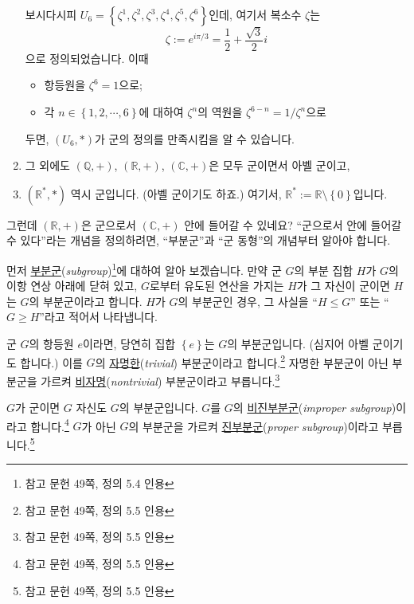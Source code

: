 \documentclass[12pt]{paper}
\begin{document}
\begin{enumerate}
    보시다시피 $U_6 = \left\{ \zeta^1 , \zeta^2 , \zeta^3 , \zeta^4 , \zeta^5 , \zeta^6 \right\}$인데,
    여기서 복소수 $\zeta$는 $$\zeta := e^{i \pi / 3} = \frac{1}{2} + \frac{\sqrt{3}}{2} i$$으로 정의되었습니다.
    이때
    \begin{itemize}
      \item 항등원을 $\zeta^6 = 1$으로;
      \item 각 $n \in \left\{ 1 , 2 , \cdots , 6 \right\}$에 대하여
      $ \zeta^n $의 역원을 $ \zeta^{6 - n} = 1 / \zeta^{n} $으로
    \end{itemize}
    두면,
    $\left( U_6 , * \right)$가 군의 정의를 만족시킴을 알 수 있습니다.
    
    \item 그 외에도 $\left( \mathbb{Q} , + \right)$, $\left( \mathbb{R} , + \right)$, $\left( \mathbb{C} , + \right)$은 모두 군이면서 아벨 군이고,

    \item $\left( \mathbb{R}^{*} , * \right)$ 역시 군입니다. (아벨 군이기도 하죠.)
    여기서, $\mathbb{R}^{*} := \mathbb{R} \setminus \left\{ 0 \right\}$입니다.

  \end{enumerate}

  그런데 $\left( \mathbb{R} , + \right)$은 군으로서 $\left( \mathbb{C} , + \right)$ 안에 들어갈 수 있네요?
  ``군으로서 안에 들어갈 수 있다''라는 개념을 정의하려면, ``부분군''과 ``군 동형''의 개념부터 알아야 합니다.

  먼저 \underline{부분군}(\textit{subgroup})\footnote{참고 문헌 \cite{fraleigh2009} 49쪽, 정의 5.4 인용}에 대하여 알아 보겠습니다.
  만약 군 $G$의 부분 집합 $H$가 $G$의 이항 연상 아래에 닫혀 있고,
  $G$로부터 유도된 연산을 가지는 $H$가 그 자신이 군이면 $H$는 $G$의 부분군이라고 합니다.
  $H$가 $G$의 부분군인 경우, 그 사실을 ``$H \leq G$'' 또는 ``$G \geq H$''라고 적어서 나타냅니다.

  군 $G$의 항등원 $e$이라면, 당연히 집합 $\left\{ e \right\}$는 $G$의 부분군입니다.
  (심지어 아벨 군이기도 합니다.)
  이를 $G$의 \underline{자명한}(\textit{trivial}) 부분군이라고 합니다.\footnote{참고 문헌 \cite{fraleigh2009} 49쪽, 정의 5.5 인용}
  자명한 부분군이 아닌 부분군을 가르켜 \underline{비자명}(\textit{nontrivial}) 부분군이라고 부릅니다.\footnote{참고 문헌 \cite{fraleigh2009} 49쪽, 정의 5.5 인용}

  $G$가 군이면 $G$ 자신도 $G$의 부분군입니다.
  $G$를 $G$의 \underline{비진부분군}(\textit{improper subgroup})이라고 합니다.\footnote{참고 문헌 \cite{fraleigh2009} 49쪽, 정의 5.5 인용}
  $G$가 아닌 $G$의 부분군을 가르켜 \underline{진부분군}(\textit{proper subgroup})이라고 부릅니다.\footnote{참고 문헌 \cite{fraleigh2009} 49쪽, 정의 5.5 인용}

  

  
\end{document}
